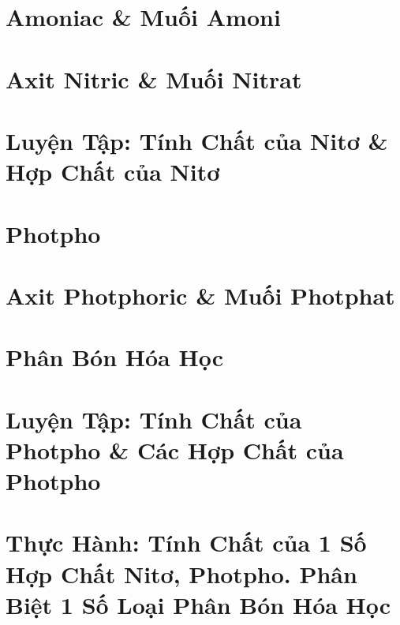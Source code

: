 \documentclass[oneside]{book}
\numberwithin{equation}{section}
\begin{document}
\section{Amoniac \& Muối Amoni}


\section{Axit Nitric \& Muối Nitrat}


\section{Luyện Tập: Tính Chất của Nitơ \& Hợp Chất của Nitơ}


\section{Photpho}


\section{Axit Photphoric \& Muối Photphat}


\section{Phân Bón Hóa Học}


\section{Luyện Tập: Tính Chất của Photpho \& Các Hợp Chất của Photpho}


\section{Thực Hành: Tính Chất của 1 Số Hợp Chất Nitơ, Photpho. Phân Biệt 1 Số Loại Phân Bón Hóa Học}
\end{document}
